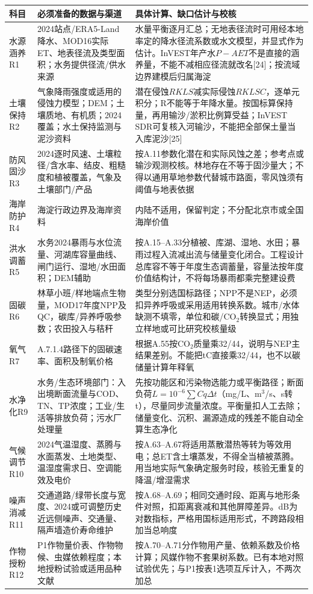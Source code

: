 \documentclass[12pt,a4paper,fontset=fandol]{ctexart}
\begin{document}
{\small
\begin{longtable}{P{1.8cm}P{5.6cm}P{5.8cm}}
\toprule 科目 & 必须准备的数据与渠道 & 具体计算、缺口估计与校核 \\\midrule\endhead
水源涵养R1 & 2024站点/ERA5-Land降水、MOD16实际ET、地表径流及类型面积；水务提供径流/供水来源 & 水量平衡逐月汇总；无地表径流时可用经本地率定的降水径流系数或水文模型，并显式作为估计。InVEST年产水$P-AET$不是直接的涵养量，不能不减相应径流就改名[24]；按流域边界建模后归属海淀 \\
土壤保持R2 & 气象降雨强度或适用的侵蚀力模型；DEM；土壤质地、有机质；2024覆盖；水土保持监测与泥沙资料 & 潜在侵蚀$RKLS$减实际侵蚀$RKLSC$，逐单元积分；R不能等于年降水量。按国标算保持量，再用输沙/淤积比例算受益；InVEST SDR可复核入河输沙，不能把全部保土量当入库泥沙[25] \\
防风固沙R3 & 2024逐时风速、土壤粒径/含水率、结皮、粗糙度和植被覆盖，气象及土壤部门/产品 & 按A.11参数化潜在和实际风蚀之差；参考点或输沙观测校核。林地存在不等于固沙量大；不得以通用草地参数代替城市路面，零风蚀须有阈值与地表依据 \\
海岸防护R4 & 海淀行政边界及海岸资料 & 内陆不适用，保留判定；不分配北京市或全国海岸价值 \\
洪水调蓄R5 & 水务2024暴雨与水位流量、河湖库容量曲线、闸门运行、湿地/水田面积；DEM辅助 & 按A.15--A.33分植被、库湖、湿地、水田；暴雨过程入流减出流与储量变化闭合。工程设计总库容不等于年度生态调蓄量，容量法按年度价值结构计，不将每场暴雨都乘完整建设费 \\
固碳R6 & 林草小班/样地端点生物量，MOD17年度NPP及QC，碳库/异养呼吸参数；农田投入与秸秆 & 类型分别选国标路径；NPP不是NEP，必须扣异养呼吸或采用适用转换系数。城市/水体缺测不填零，单位和碳/CO$_2$转换显式；用独立样地或可比研究校核量级 \\
氧气R7 & A.7.1.4路径下的固碳速率、面积及制氧价格 & 根据A.55按CO$_2$质量乘32/44，说明与NEP主结果差别。不能把tC直接乘32/44，也不以碳储量计算年释氧 \\
水净化R9 & 水务/生态环境部门：入出境断面流量与COD、TN、TP浓度；工业/生活等排放负荷；污水厂处理量 & 先按功能区和污染物选能力或平衡路径；断面负荷$L=10^{-6}\sum Cq\Delta t$（mg/L、m$^3$/s、s转t），尽量同步流量浓度。平衡量扣人工去除；储量变化、沉积、漏源造成的残差不能自动全算生态净化 \\
气候调节R10 & 2024气温湿度、蒸腾与水面蒸发、土地类型、温湿度需求日、空调能效及电价 & 按A.63--A.67将适用蒸散潜热等转为等效用电；总ET含土壤蒸发，不得全当植被蒸腾。用当地实际气象确定服务时段，核验无重复的降温/增湿需求 \\
噪声消减R11 & 交通道路/绿带长度与宽度、2024或可调整历史近远侧噪声、交通量、隔声墙造价寿命维护 & 按A.68--A.69；相同交通时段、距离与地形条件对照，扣距离衰减和其他屏障差异。dB为对数指标，严格用国标适用形式，不跨路段相加当总响度 \\
作物授粉R12 & P1作物量价表、作物物候、虫媒依赖程度；本地授粉试验或适用品种文献 & 按A.70--A.71分作物用产量、依赖系数及价格计算；风媒作物不套果树系数。已有本地对照试验优先；与P1按表1选项互斥计入，不两次加总 \\
\bottomrule
\end{longtable}}
\end{document}

